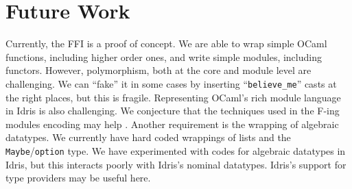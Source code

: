 \documentclass[a4paper,10pt,twocolumn]{article}
\begin{document}
\section{Future Work}

Currently, the FFI is a proof of concept. We are able to wrap simple
OCaml functions, including higher order ones, and write simple
modules, including functors. However, polymorphism, both at the core
and module level are challenging. We can ``fake'' it in some cases by
inserting ``\texttt{believe\_me}'' casts at the right places, but this
is fragile. Representing OCaml's rich module language in Idris is also
challenging. We conjecture that the techniques used in the F-ing
modules encoding may help \cite{f-modules}. Another requirement is the
wrapping of algebraic datatypes. We currently have hard coded
wrappings of lists and the \texttt{Maybe}/\texttt{option} type. We
have experimented with codes for algebraic datatypes in Idris, but
this interacts poorly with Idris's nominal datatypes. Idris's support
for type providers \cite{type-providers} may be useful here.


\end{document}
